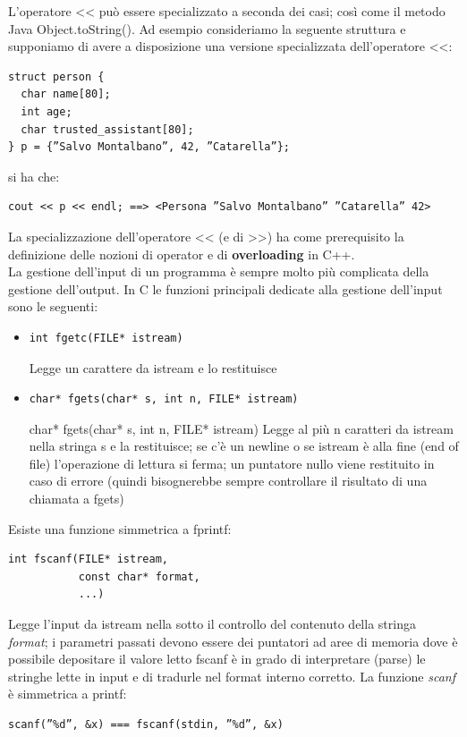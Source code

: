\documentclass[a4paper,12pt, oneside]{book}
\begin{document}
L’operatore << può essere specializzato a seconda dei casi;
così come il metodo Java Object.toString(). Ad esempio consideriamo la seguente struttura e supponiamo
di avere a disposizione una versione specializzata
dell’operatore <<:
\begin{verbatim}
struct person {
  char name[80];
  int age;
  char trusted_assistant[80];
} p = {”Salvo Montalbano”, 42, ”Catarella”};
\end{verbatim}
si ha che:
\begin{verbatim}
cout << p << endl; ==> <Persona ”Salvo Montalbano” ”Catarella” 42>
\end{verbatim}
La specializzazione dell’operatore << (e di >>) ha come
prerequisito la definizione delle nozioni di operator e di
\textbf{overloading }in C++.\\
La gestione dell’input di un programma è sempre molto più
complicata della gestione dell’output. In C le funzioni principali dedicate alla gestione dell’input sono
le seguenti:
\begin{itemize}
\item
\begin{verbatim}
int fgetc(FILE* istream)
\end{verbatim}
Legge un carattere da istream e lo restituisce
\item 
\begin{verbatim}
char* fgets(char* s, int n, FILE* istream)
\end{verbatim}
char* fgets(char* s, int n, FILE* istream)
Legge al più n caratteri da istream nella stringa s e la restituisce;
se c’è un newline o se istream è alla fine (end of file) l’operazione di lettura si ferma; un puntatore nullo viene restituito in caso di errore (quindi bisognerebbe sempre controllare il risultato di una chiamata a
fgets)
\end{itemize}
Esiste una funzione simmetrica a fprintf:
\begin{verbatim}
int fscanf(FILE* istream,
           const char* format,
           ...)
\end{verbatim}
Legge l’input da istream nella sotto il controllo del contenuto della stringa \textit{format}; i parametri passati devono essere dei puntatori ad
aree di memoria dove è possibile depositare il valore letto
fscanf è in grado di interpretare (parse) le stringhe lette in input e di tradurle nel format interno corretto. La funzione \textit{scanf} è simmetrica a printf:
\begin{verbatim}
scanf(”%d”, &x) === fscanf(stdin, ”%d”, &x)
\end{verbatim}
\end{document}
